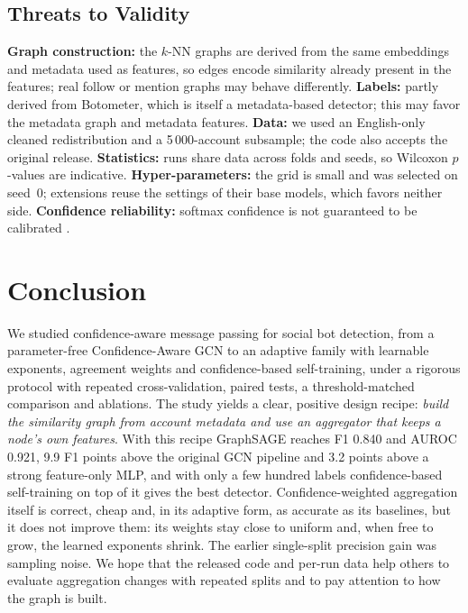 \documentclass{csimq}
\begin{document}
\subsection{Threats to Validity}
\label{sec:threats}
\textbf{Graph construction:} the $k$-NN graphs are derived from the same embeddings and metadata used as features, so edges encode similarity already present in the features; real follow or mention graphs may behave differently. \textbf{Labels:} partly derived from Botometer, which is itself a metadata-based detector; this may favor the metadata graph and metadata features. \textbf{Data:} we used an English-only cleaned redistribution and a 5\,000-account subsample; the code also accepts the original release. \textbf{Statistics:} runs share data across folds and seeds, so Wilcoxon $p$-values are indicative. \textbf{Hyper-parameters:} the grid is small and was selected on seed~0; extensions reuse the settings of their base models, which favors neither side. \textbf{Confidence reliability:} softmax confidence is not guaranteed to be calibrated \cite{guo2017calibration}.

\section{Conclusion}
We studied confidence-aware message passing for social bot detection, from a parameter-free Confidence-Aware GCN to an adaptive family with learnable exponents, agreement weights and confidence-based self-training, under a rigorous protocol with repeated cross-validation, paired tests, a threshold-matched comparison and ablations. The study yields a clear, positive design recipe: \emph{build the similarity graph from account metadata and use an aggregator that keeps a node's own features}. With this recipe GraphSAGE reaches F1 0.840 and AUROC 0.921, 9.9 F1 points above the original GCN pipeline and 3.2 points above a strong feature-only MLP, and with only a few hundred labels confidence-based self-training on top of it gives the best detector. Confidence-weighted aggregation itself is correct, cheap and, in its adaptive form, as accurate as its baselines, but it does not improve them: its weights stay close to uniform and, when free to grow, the learned exponents shrink. The earlier single-split precision gain was sampling noise. We hope that the released code and per-run data help others to evaluate aggregation changes with repeated splits and to pay attention to how the graph is built.
\end{document}
